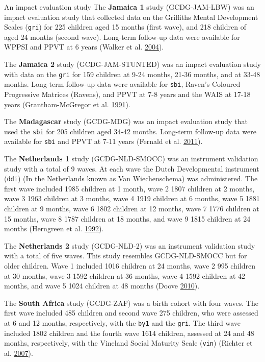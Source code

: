 \documentclass[
]{book}
\begin{document}
An impact evaluation study
The \textbf{Jamaica 1} study (GCDG-JAM-LBW) was an impact evaluation study that collected data on the Griffiths Mental Development Scales (\texttt{gri}) for 225 children aged 15 months (first wave), and 218 children of aged 24 months (second wave). Long-term follow-up data were available for WPPSI and PPVT at 6 years (Walker et al. \protect\hyperlink{ref-Walker2004}{2004}).

The \textbf{Jamaica 2} study (GCDG-JAM-STUNTED) was an impact evaluation study with data on the \texttt{gri} for 159 children at 9-24 months, 21-36 months, and at 33-48 months. Long-term follow-up data were available for \texttt{sbi}, Raven's Coloured Progressive Matrices (Ravens), and PPVT at 7-8 years and the WAIS at 17-18 years (Grantham-McGregor et al. \protect\hyperlink{ref-Grantham-McGregor1991}{1991}).

The \textbf{Madagascar} study (GCDG-MDG) was an impact evaluation study that used the \texttt{sbi} for 205 children aged 34-42 months. Long-term follow-up data were available for \texttt{sbi} and PPVT at 7-11 years (Fernald et al. \protect\hyperlink{ref-Fernald2011}{2011}).

The \textbf{Netherlands 1} study (GCDG-NLD-SMOCC) was an instrument validation study with a total of 9 waves. At each wave the Dutch Developmental instrument (\texttt{ddi}) (In the Netherlands known as Van Wiechenschema) was administered. The first wave included 1985 children at 1 month, wave 2 1807 children at 2 months, wave 3 1963 children at 3 months, wave 4 1919 children at 6 months, wave 5 1881 children at 9 months, wave 6 1802 children at 12 months, wave 7 1776 children at 15 months, wave 8 1787 children at 18 months, and wave 9 1815 children at 24 months (Herngreen et al. \protect\hyperlink{ref-herngreen1992}{1992}).

The \textbf{Netherlands 2} study (GCDG-NLD-2) was an instrument validation study with a total of five waves. This study resembles GCDG-NLD-SMOCC but for older children. Wave 1 included 1016 children at 24 months, wave 2 995 children at 30 months, wave 3 1592 children at 36 months, wave 4 1592 children at 42 months, and wave 5 1024 children at 48 months (Doove \protect\hyperlink{ref-doove2010}{2010}).

The \textbf{South Africa} study (GCDG-ZAF) was a birth cohort with four waves. The first wave included 485 children and second wave 275 children, who were assessed at 6 and 12 months, respectively, with the \texttt{by1} and the \texttt{gri}. The third wave included 1802 children and the fourth wave 1614 children, assessed at 24 and 48 months, respectively, with the Vineland Social Maturity Scale (\texttt{vin}) (Richter et al. \protect\hyperlink{ref-Richter2007}{2007}).
\end{document}
